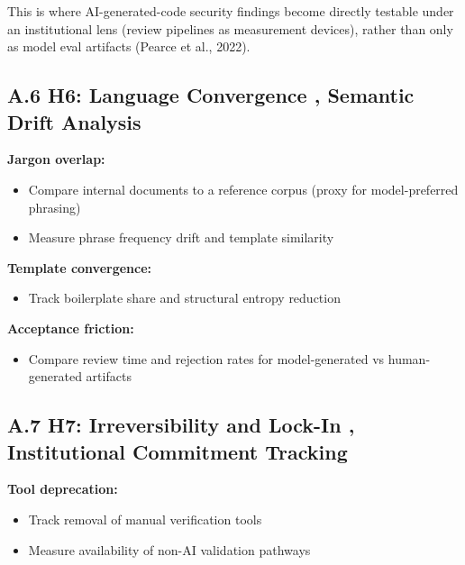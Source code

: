 \documentclass[11pt,a4paper]{article}
\providecommand{\tightlist}{\setlength{\itemsep}{0pt}\setlength{\parskip}{0pt}}
\begin{document}
This is where AI-generated-code security findings become directly testable under an institutional lens (review pipelines as measurement devices), rather than only as model eval artifacts (Pearce et al., 2022).

\hypertarget{a.6-h6-language-convergence-semantic-drift-analysis}{%
\subsection{A.6 H6: Language Convergence ,  Semantic Drift Analysis}\label{a.6-h6-language-convergence-semantic-drift-analysis}}

\textbf{Jargon overlap:}

\begin{itemize}
\tightlist
\item
  Compare internal documents to a reference corpus (proxy for model-preferred phrasing)
\item
  Measure phrase frequency drift and template similarity
\end{itemize}

\textbf{Template convergence:}

\begin{itemize}
\tightlist
\item
  Track boilerplate share and structural entropy reduction
\end{itemize}

\textbf{Acceptance friction:}

\begin{itemize}
\tightlist
\item
  Compare review time and rejection rates for model-generated vs human-generated artifacts
\end{itemize}

\hypertarget{a.7-h7-irreversibility-and-lock-in-institutional-commitment-tracking}{%
\subsection{A.7 H7: Irreversibility and Lock-In ,  Institutional Commitment Tracking}\label{a.7-h7-irreversibility-and-lock-in-institutional-commitment-tracking}}

\textbf{Tool deprecation:}

\begin{itemize}
\tightlist
\item
  Track removal of manual verification tools
\item
  Measure availability of non-AI validation pathways
\end{itemize}
\end{document}
